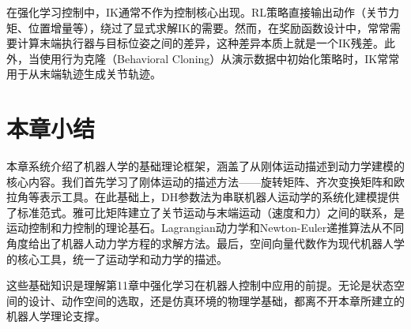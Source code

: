 \begin{remark}
在强化学习控制中，IK通常不作为控制核心出现。RL策略直接输出动作（关节力矩、位置增量等），绕过了显式求解IK的需要。然而，在奖励函数设计中，常常需要计算末端执行器与目标位姿之间的差异，这种差异本质上就是一个IK残差。此外，当使用行为克隆（Behavioral Cloning）从演示数据中初始化策略时，IK常常用于从末端轨迹生成关节轨迹。
\end{remark}

\section{本章小结}

本章系统介绍了机器人学的基础理论框架，涵盖了从刚体运动描述到动力学建模的核心内容。我们首先学习了刚体运动的描述方法——旋转矩阵、齐次变换矩阵和欧拉角等表示工具。在此基础上，DH参数法为串联机器人运动学的系统化建模提供了标准范式。雅可比矩阵建立了关节运动与末端运动（速度和力）之间的联系，是运动控制和力控制的理论基石。Lagrangian动力学和Newton-Euler递推算法从不同角度给出了机器人动力学方程的求解方法。最后，空间向量代数作为现代机器人学的核心工具，统一了运动学和动力学的描述。

这些基础知识是理解第11章中强化学习在机器人控制中应用的前提。无论是状态空间的设计、动作空间的选取，还是仿真环境的物理学基础，都离不开本章所建立的机器人学理论支撑。

